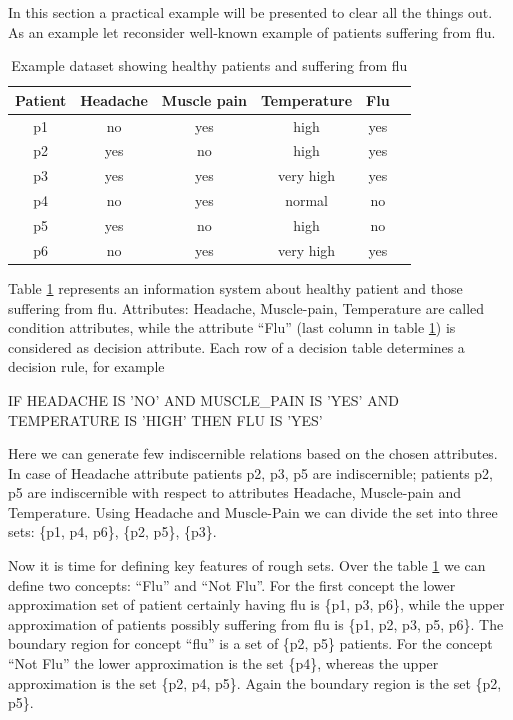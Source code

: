In this section a practical example will be presented to clear all the things
out. As an example let reconsider well-known example of patients suffering from
flu. 
\begin{table}[H]
    \centering
    \caption{Example dataset showing healthy patients and suffering from flu}
    \begin{tabular}{|c|c|c|c|c|c|}
        \hline 
    Patient & Headache & Muscle pain & Temperature & Flu \\ \hline \hline
    p1 & no & yes & high & yes \\ \hline
    p2 & yes & no & high & yes \\ \hline
    p3 & yes & yes & very high & yes \\ \hline
    p4 & no & yes & normal & no \\ \hline
    p5 & yes & no & high & no \\ \hline
    p6 & no & yes & very high & yes \\ \hline    
    \end{tabular}
    \label{tab:example_rough_set}
\end{table}
Table \ref{tab:example_rough_set} represents an information system about
healthy patient and those suffering from flu. Attributes: Headache,
Muscle-pain, Temperature are called condition attributes, while the attribute
``Flu'' (last column in table \ref{tab:example_rough_set}) is considered as
decision attribute. Each row of a decision table determines a decision rule,
for example

IF HEADACHE IS 'NO' AND MUSCLE\_PAIN IS 'YES' AND TEMPERATURE IS 'HIGH' THEN FLU IS 'YES'

Here we can generate few indiscernible relations based on 
the chosen attributes. In case of Headache attribute patients p2, p3, p5 are indiscernible; patients p2, p5 are
indiscernible with respect to attributes Headache, Muscle-pain and Temperature. 
Using Headache and Muscle-Pain we can divide the set into three sets:
\{p1, p4, p6\}, \{p2, p5\}, \{p3\}.

Now it is time for defining key features of rough sets. Over the table
\ref{tab:example_rough_set} we can define two concepts: ``Flu'' and
``Not Flu''. For the first concept the lower approximation
set of patient certainly having flu is \{p1, p3, p6\}, while the upper
approximation of patients possibly suffering from flu is \{p1, p2, p3, p5,
p6\}. The boundary region for concept ``flu'' is a set of \{p2, p5\} patients. 
For the concept ``Not Flu'' the lower approximation is the set \{p4\}, whereas
the upper approximation is the set \{p2, p4, p5\}. Again the boundary region is
the set \{p2, p5\}.

